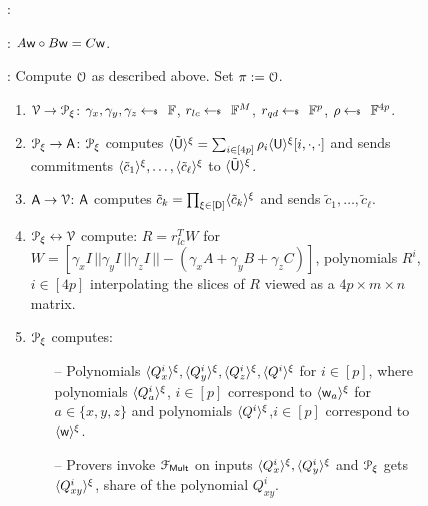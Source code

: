 \begin{figure*}[h]
	{\footnotesize
		\begin{framed}
			:
			
			: $A\wit\circ B\wit=C\wit$. 
			
			: Compute $\comoracle$ as described above. Set $\pi := \comoracle$.
			\begin{enumerate}[{\rm 1.}]
				\item $\verifier\rightarrow\distprover$: $\gamma_x,\gamma_y,\gamma_z\sample \FF$, $r_{lc}\sample \FF^M$, $r_{qd}\sample \FF^{p}$, $\rho\sample \FF^{4p}$.
				\item $\distprover\rightarrow\Ag$: $\distprover$ computes $\shr{\tilde{\ewit}} = \sum_{i\in[4p]} \rho_i \shr{\ewit}[i,\cdot,\cdot]$ and sends commitments
				$\shr{\tilde{c}_1},\ldots,\shr{\tilde{c}_\ell}$ to $\shr{\tilde{\ewit}}$.
				\item $\Ag \rightarrow \verifier$: $\Ag$ computes $\tilde{c}_k = \prod_{\xi \in [\Num]} \shr{\tilde{c}_k}$ and sends $\tilde{c}_1,\ldots, \tilde{c}_{\ell}$.
				\item $\distprover\leftrightarrow\verifier$ compute: $R=r_{lc}^TW$ for $W=[\gamma_xI\,||\gamma_yI\,||\gamma_zI\,||-(\gamma_xA+\gamma_yB+\gamma_zC)]$, polynomials $R^i$,$i\in [4p]$ interpolating the slices of $R$ viewed as a $4p\times m\times n$ matrix.
				\item $\distprover$ computes: 
				\begin{itemize}
					\item[--] Polynomials $\shr{Q^i_x},\shr{Q^i_y},\shr{Q^i_z},\shr{Q^i}$ for $i\in [p]$, where polynomials $\shr{Q^i_a}$, $i\in [p]$ correspond to $\shr{\wit_a}$ for $a\in \{x,y,z\}$ and polynomials $\shr{Q^i}$,$i\in [p]$ correspond to $\shr{\wit}$. 
					\item[--] Provers invoke $\FMult$ on inputs $\shr{Q^i_x}, \shr{Q^i_y}$ and $\distprover$ gets $\shr{Q^i_{xy}}$, share of the polynomial $Q^i_{xy}$.

\end{itemize}
\end{enumerate}
\end{framed}}
\end{figure*}

